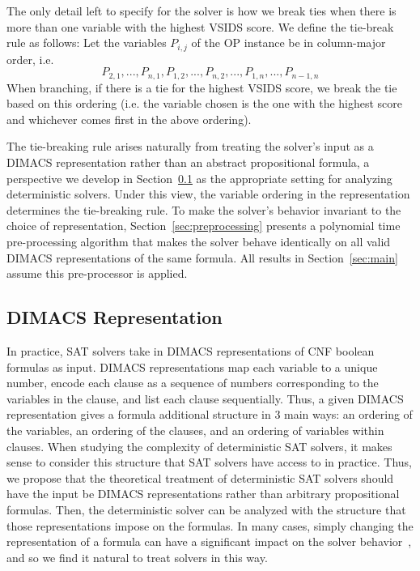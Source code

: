 \documentclass[a4paper,UKenglish,cleveref, autoref, thm-restate]{lipics-v2021}
\begin{document}
The only detail left to specify for the solver is how we break ties when there is more than one variable with the highest VSIDS score. We define the tie-break rule as follows: Let the variables $P_{i, j}$ of the OP instance be in column-major order, i.e. $$P_{2, 1}, ..., P_{n, 1}, P_{1, 2}, ..., P_{n, 2}, ..., P_{1, n}, ..., P_{n - 1, n}$$
When branching, if there is a tie for the highest VSIDS score, we break the tie based on this ordering (i.e. the variable chosen is the one with the highest score and whichever comes first in the above ordering).

The tie-breaking rule arises naturally from treating the solver's input as a DIMACS representation rather than an abstract propositional formula, a perspective we develop in Section~\ref{sec:dimacs} as the appropriate setting for analyzing deterministic solvers. Under this view, the variable ordering in the representation determines the tie-breaking rule. To make the solver's behavior invariant to the choice of representation, Section~\ref{sec:preprocessing} presents a polynomial time pre-processing algorithm that makes the solver behave identically on all valid DIMACS representations of the same formula. All results in Section~\ref{sec:main} assume this pre-processor is applied.

\subsection{DIMACS Representation}
\label{sec:dimacs}

In practice, SAT solvers take in DIMACS representations of CNF boolean formulas as input. DIMACS representations map each variable to a unique number, encode each clause as a sequence of numbers corresponding to the variables in the clause, and list each clause sequentially. Thus, a given DIMACS representation gives a formula additional structure in 3 main ways: an ordering of the variables, an ordering of the clauses, and an ordering of variables within clauses. When studying the complexity of deterministic SAT solvers, it makes sense to consider this structure that SAT solvers have access to in practice. Thus, we propose that the theoretical treatment of deterministic SAT solvers should have the input be DIMACS representations rather than arbitrary propositional formulas. Then, the deterministic solver can be analyzed with the structure that those representations impose on the formulas. In many cases, simply changing the representation of a formula can have a significant impact on the solver behavior~\cite{audemard2008experimenting}, and so we find it natural to treat solvers in this way.
\end{document}
